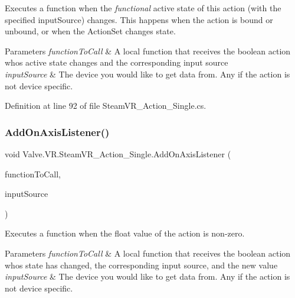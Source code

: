 Executes a function when the {\itshape functional} active state of this action (with the specified input\+Source) changes. This happens when the action is bound or unbound, or when the Action\+Set changes state. 


\begin{DoxyParams}{Parameters}
{\em function\+To\+Call} & A local function that receives the boolean action who\textquotesingle{}s active state changes and the corresponding input source\\
\hline
{\em input\+Source} & The device you would like to get data from. Any if the action is not device specific.\\
\hline
\end{DoxyParams}


Definition at line 92 of file Steam\+V\+R\+\_\+\+Action\+\_\+\+Single.\+cs.

\mbox{\label{class_valve_1_1_v_r_1_1_steam_v_r___action___single_a7de52c2fa108e420f018e31065c915be}} 
\subsubsection{\texorpdfstring{AddOnAxisListener()}{AddOnAxisListener()}}
{\footnotesize\ttfamily void Valve.\+V\+R.\+Steam\+V\+R\+\_\+\+Action\+\_\+\+Single.\+Add\+On\+Axis\+Listener (\begin{DoxyParamCaption}\item[{\mbox{\hyperlink{class_valve_1_1_v_r_1_1_steam_v_r___action___single_a4193937cd6b6e4b7248374bc5636f6fd}{Axis\+Handler}}}]{function\+To\+Call,  }\item[{\mbox{\hyperlink{namespace_valve_1_1_v_r_a82e5bf501cc3aa155444ee3f0662853f}{Steam\+V\+R\+\_\+\+Input\+\_\+\+Sources}}}]{input\+Source }\end{DoxyParamCaption})}



Executes a function when the float value of the action is non-\/zero. 


\begin{DoxyParams}{Parameters}
{\em function\+To\+Call} & A local function that receives the boolean action who\textquotesingle{}s state has changed, the corresponding input source, and the new value\\
\hline
{\em input\+Source} & The device you would like to get data from. Any if the action is not device specific.\\
\hline
\end{DoxyParams}


